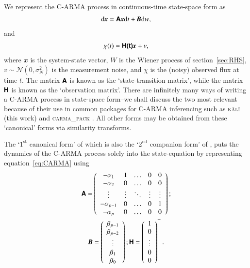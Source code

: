 \documentclass[a4paper,fleqn,usenatbib]{mnras}
\begin{document}
We represent the C-ARMA process in continuous-time state-space form \citep{Wiberg,Friedland} as
\begin{equation}\label{eq:StateEqn}
\mathrm{d}\textbf{\textit{x}} = \textbf{\textsf{A}}\textbf{\textit{x}}\mathrm{d}t + \textbf{\textit{B}}\mathrm{d}w,
\end{equation}
and
\begin{equation}\label{eq:ObsEqn}
\chi(t) = \textbf{\textsf{H(t)}}\textbf{\textit{x}} + v,
\end{equation}
where $\mathbfit{x}$ is the system-state vector, $W$ is the Wiener process of section~\ref{sec:RHS}, $v \sim \mathcal{N}(0,\sigma^{2}_{N})$ is the measurement noise, and $\chi$ is the (noisy) observed flux at time $t$. The matrix $\textbf{\textsf{A}}$ is known as the `state-transition matrix', while the matrix $\textbf{\textsf{H}}$ is known as the `observation matrix'. There are infinitely many ways of writing a C-ARMA process in state-space form--we shall discuss the two most relevant \citep{Denham74,Kailath74} because of their use in common packages for C-ARMA inferencing such as \textsc{k\={a}l\={i}} (this work) and \textsc{carma\_pack} \citep{Kelly14}. All other forms may be obtained from these `canonical' forms via similarity transforms.

The `$1^{\mathrm{st}}$ canonical form' of \citet{Wiberg} which is also the `$2^{\mathrm{nd}}$ companion form' of \citet{Friedland}, puts the dynamics of the C-ARMA process solely into the state-equation by representing equation~\eqref{eq:CARMA} using
\begin{multline}\label{eq:1stCanForm}
\textbf{\textsf{A}} = \left( \begin{array}{ccccc} 
-\alpha_{1} & 1 & \hdots & 0 & 0 \\
-\alpha_{2} & 0 & \hdots & 0 & 0 \\
\vdots & \vdots & \ddots & \vdots & \vdots \\
-\alpha_{p-1} & 0 & \hdots & 0 & 1 \\
-\alpha_{p} & 0 & \hdots & 0 & 0 \\
\end{array}\right); \\ \textbf{\textit{B}} = \left( \begin{array}{c} \beta_{p-1} \\ \beta_{p-2} \\ \vdots \\ \beta_{1} \\ \beta_{0} \end{array} \right); \textbf{\textsf{H}} = \left( \begin{array}{c} 1 \\ 0 \\ \vdots \\ 0 \\ 0 \end{array} \right)^{\top}.
\end{multline}
\end{document}
